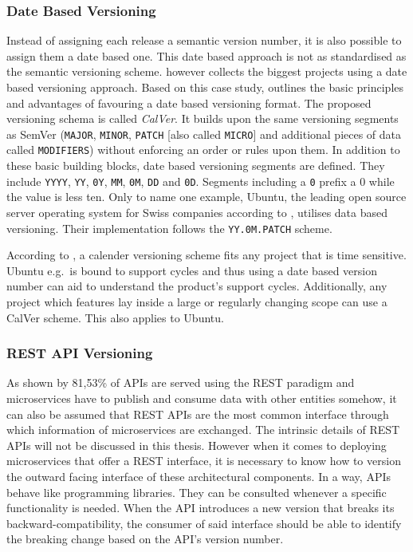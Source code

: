 \subsubsection{Date Based Versioning}%
\label{ssub:Date_Based_Versioning}
Instead of assigning each release a semantic version number, it is also
possible to assign them a date based one. This date based approach is not as
standardised as the semantic versioning scheme.
\autocite{HashemiCalendarVersioning2017} however collects the biggest projects
using a date based versioning approach. Based on this case study,
\autocite{HashemiCalendarVersioning2017} outlines the basic principles and
advantages of favouring a date based versioning format. The proposed versioning
schema is called \textit{CalVer}. It builds upon the same versioning segments
as SemVer (\texttt{MAJOR}, \texttt{MINOR}, \texttt{PATCH} [also called
\texttt{MICRO}] and additional pieces of data called \texttt{MODIFIERS})
without enforcing an order or rules upon them. In addition to these basic
building blocks, date based versioning segments are defined. They include
\texttt{YYYY}, \texttt{YY}, \texttt{0Y}, \texttt{MM}, \texttt{0M}, \texttt{DD}
and \texttt{0D}. Segments including a \texttt{0} prefix a 0 while the value is
less ten. Only to name one example, Ubuntu, the leading open source server
operating system for Swiss companies according to
\autocite{SwissICTWelcheOpenSource2018}, utilises data based versioning. Their
implementation follows the \texttt{YY.0M.PATCH} scheme.

According to \autocite{HashemiCalendarVersioning2017}, a calender versioning
scheme fits any project that is time sensitive. Ubuntu e.g.\ is bound to
support cycles and thus using a date based version number can aid to understand
the product's support cycles. Additionally, any project which features lay
inside a large or regularly changing scope can use a CalVer scheme. This also
applies to Ubuntu.

\subsubsection{REST API Versioning}%
\label{ssub:API_Versioning}
As shown by \autocite{SantosWhichAPITypes2017} 81,53\% of \acp{API} are
served using the \ac{REST} paradigm and microservices have to publish and
consume data with other entities somehow, it can also be assumed that \ac{REST}
\acp{API} are the most common interface through which information of
microservices are exchanged. The intrinsic details of \ac{REST} \acp{API} will
not be discussed in this thesis. However when it comes to deploying
microservices that offer a \ac{REST} interface, it is necessary to know how to
version the outward facing interface of these architectural components. In a
way, \acp{API} behave like programming libraries. They can be consulted
whenever a specific functionality is needed. When the \ac{API} introduces a new
version that breaks its backward-compatibility, the consumer of said interface
should be able to identify the breaking change based on the \ac{API}'s version
number.

